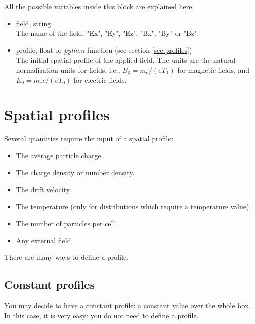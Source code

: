 \documentclass[11pt]{article}
\newcommand{\code}[1]{\colorbox{yellow!15}{\ttfamily #1}}
\newcommand{\python}{\emph{python}\xspace}
\begin{document}
All the possible variables inside this block are explained here:
\vspace{-10pt}
\begin{itemize}

\item \code{field}, string\\
The name of the field: \code{"Ex"}, \code{"Ey"}, \code{"Ez"}, \code{"Bx"}, \code{"By"} or \code{"Bz"}.

\item \code{profile}, float or \python function (see section \ref{sec:profiles})\\
The initial spatial profile of the applied field. The units are the natural normalization units for fields, i.e., $B_0=m_e /(eT_0)$ for magnetic fields, and $E_0=m_e c/(eT_0)$ for electric fields.

\end{itemize}


\section{Spatial profiles\label{sec:profiles}}

Several quantities require the input of a spatial profile:
\begin{itemize}
\item The average particle charge.
\item The charge density or number density.
\item The drift velocity.
\item The temperature (only for distributions which require a temperature value).
\item The number of particles per cell.
\item Any external field.
\end{itemize}

There are many ways to define a profile.

\subsection{Constant profiles}
You may decide to have a constant profile: a constant value over the whole box.
In this case, it is very easy: you do not need to define a profile.
\end{document}
